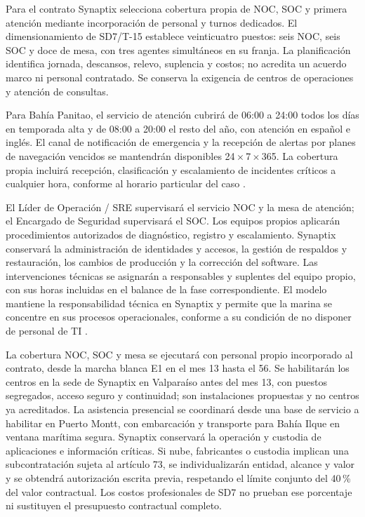Para el contrato Synaptix selecciona cobertura propia de NOC, SOC y primera atención mediante incorporación de personal y turnos dedicados. El dimensionamiento de SD7/T-15 establece veinticuatro puestos: seis NOC, seis SOC y doce de mesa, con tres agentes simultáneos en su franja. La planificación identifica jornada, descansos, relevo, suplencia y costos; no acredita un acuerdo marco ni personal contratado. Se conserva la exigencia de centros de operaciones y atención de consultas.\parencite[RT-11.17; RT-21.01/05/14]{bases-transversales}

Para Bahía Panitao, el servicio de atención cubrirá de 06:00 a 24:00 todos los días en temporada alta y de 08:00 a 20:00 el resto del año, con atención en español e inglés. El canal de notificación de emergencia y la recepción de alertas por planes de navegación vencidos se mantendrán disponibles 24\,$\times$\,7\,$\times$\,365. La cobertura propia incluirá recepción, clasificación y escalamiento de incidentes críticos a cualquier hora, conforme al horario particular del caso \parencite[cap.~15, RT-21.06 y RT-13.12]{caso07}.

El Líder de Operación / SRE supervisará el servicio NOC y la mesa de atención; el Encargado de Seguridad supervisará el SOC. Los equipos propios aplicarán procedimientos autorizados de diagnóstico, registro y escalamiento. Synaptix conservará la administración de identidades y accesos, la gestión de respaldos y restauración, los cambios de producción y la corrección del software. Las intervenciones técnicas se asignarán a responsables y suplentes del equipo propio, con sus horas incluidas en el balance de la fase correspondiente. El modelo mantiene la responsabilidad técnica en Synaptix y permite que la marina se concentre en sus procesos operacionales, conforme a su condición de no disponer de personal de TI \parencite[sec.~9.11; cap.~10, restricción~7]{caso07}.

La cobertura NOC, SOC y mesa se ejecutará con personal propio incorporado al contrato, desde la marcha blanca E1 en el mes 13 hasta el 56. Se habilitarán los centros en la sede de Synaptix en Valparaíso antes del mes 13, con puestos segregados, acceso seguro y continuidad; son instalaciones propuestas y no centros ya acreditados. La asistencia presencial se coordinará desde una base de servicio a habilitar en Puerto Montt, con embarcación y transporte para Bahía Ilque en ventana marítima segura. Synaptix conservará la operación y custodia de aplicaciones e información críticas. Si nube, fabricantes o custodia implican una subcontratación sujeta al artículo 73, se individualizarán entidad, alcance y valor y se obtendrá autorización escrita previa, respetando el límite conjunto del 40\,\% del valor contractual. Los costos profesionales de SD7 no prueban ese porcentaje ni sustituyen el presupuesto contractual completo.\parencite[art.~73]{bases-admin}

